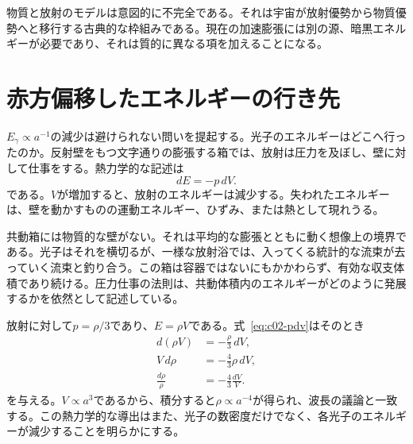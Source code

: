 \begin{classroomqa}
\end{classroomqa}

物質と放射のモデルは意図的に不完全である。それは宇宙が放射優勢から物質優勢へと移行する古典的な枠組みである。現在の加速膨張には別の源、暗黒エネルギーが必要であり、それは質的に異なる項を加えることになる。

\section{赤方偏移したエネルギーの行き先}

\(E_\gamma\propto a^{-1}\)の減少は避けられない問いを提起する。光子のエネルギーはどこへ行ったのか。反射壁をもつ文字通りの膨張する箱では、放射は圧力を及ぼし、壁に対して仕事をする。熱力学的な記述は
\begin{equation}
dE=-p\,dV.
\label{eq:c02-pdv}
\end{equation}
である。\(V\)が増加すると、放射のエネルギーは減少する。失われたエネルギーは、壁を動かすものの運動エネルギー、ひずみ、または熱として現れうる。

共動箱には物質的な壁がない。それは平均的な膨張とともに動く想像上の境界である。光子はそれを横切るが、一様な放射浴では、入ってくる統計的な流束が去っていく流束と釣り合う。この箱は容器ではないにもかかわらず、有効な収支体積であり続ける。圧力仕事の法則は、共動体積内のエネルギーがどのように発展するかを依然として記述している。

放射に対して\(p=\rho/3\)であり、\(E=\rho V\)である。式~\eqref{eq:c02-pdv}はそのとき
\begin{align}
d(\rho V)&=-\frac{\rho}{3}\,dV,\\
V\,d\rho&=-\frac{4}{3}\rho\,dV,\\
\frac{d\rho}{\rho}&=-\frac{4}{3}\frac{dV}{V}.
\end{align}
を与える。\(V\propto a^3\)であるから、積分すると\(\rho\propto a^{-4}\)が得られ、波長の議論と一致する。この熱力学的な導出はまた、光子の数密度だけでなく、各光子のエネルギーが減少することを明らかにする。

